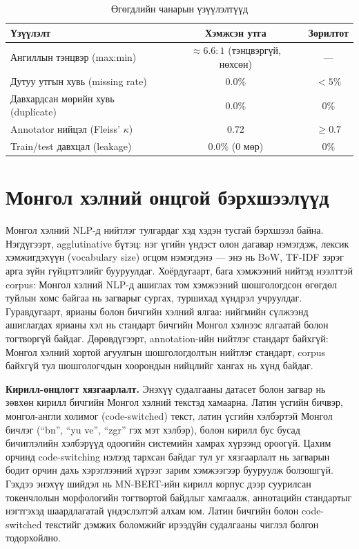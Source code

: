 \begin{table}[H]
\centering
\caption{Өгөгдлийн чанарын үзүүлэлтүүд}
\label{tab:data-quality}
\begin{tabular}{@{}lcc@{}}
\toprule
\textbf{Үзүүлэлт} & \textbf{Хэмжсэн утга} & \textbf{Зорилтот} \\
\midrule
Ангиллын тэнцвэр (max:min)        & $\approx 6.6{:}1$ (тэнцвэргүй, нөхсөн) & --- \\
Дутуу утгын хувь (missing rate)   & $0.0\%$ & $<5\%$ \\
Давхардсан мөрийн хувь (duplicate)& $0.0\%$ & $0\%$ \\
Annotator нийцэл (Fleiss' $\kappa$)& $0.72$ & $\geq 0.7$ \\
Train/test давхцал (leakage)      & $0.0\%$ ($0$ мөр) & $0\%$ \\
\bottomrule
\end{tabular}
\end{table}

\section{Монгол хэлний онцгой бэрхшээлүүд}

Монгол хэлний NLP-д нийтлэг тулгардаг хэд хэдэн тусгай бэрхшээл байна.
Нэгдүгээрт, agglutinative бүтэц: нэг үгийн үндэст олон дагавар нэмэгдэж, лексик
хэмжигдэхүүн (vocabulary size) огцом нэмэгдэнэ --- энэ нь BoW, TF-IDF зэрэг
арга зүйн гүйцэтгэлийг бууруулдаг. Хоёрдугаарт, бага хэмжээний нийтэд нээлттэй
corpus: Монгол хэлний NLP-д ашиглах том хэмжээний шошгологдсон өгөгдөл туйлын
хомс байгаа нь загварыг сургах, туршихад хүндрэл учруулдаг. Гуравдугаарт,
ярианы болон бичгийн хэлний ялгаа: нийгмийн сүлжээнд ашиглагдах ярианы хэл нь
стандарт бичгийн Монгол хэлнээс ялгаатай болон тогтворгүй байдаг. Дөрөвдүгээрт,
annotation-ийн нийтлэг стандарт байхгүй: Монгол хэлний хортой агуулгын
шошгологдолтын нийтлэг стандарт, corpus байхгүй тул шошгологчдын хоорондын
нийцлийг хангах нь хүнд байдаг.

\textbf{Кирилл-онцлогт хязгаарлалт.} Энэхүү судалгааны датасет болон загвар нь
зөвхөн кирилл бичгийн Монгол хэлний текстэд хамаарна. Латин үсгийн бичвэр,
монгол-англи холимог (code-switched) текст, латин үсгийн хэлбэртэй Монгол бичлэг (``bn'',
``yu ve'', ``zgr'' гэх мэт хэлбэр), болон кирилл бус бусад бичиглэлийн хэлбэрүүд
одоогийн системийн хамрах хүрээнд ороогүй. Цахим орчинд code-switching нэлээд
тархсан байдаг тул уг хязгаарлалт нь загварын бодит орчин дахь хэрэглээний
хүрээг зарим хэмжээгээр бууруулж болзошгүй. Гэхдээ энэхүү шийдэл нь MN-BERT-ийн
кирилл корпус дээр суурилсан токенчлолын морфологийн тогтвортой байдлыг
хамгаалж, аннотацийн стандартыг нэгтгэхэд шаардлагатай үндэслэлтэй алхам юм.
Латин бичгийн болон code-switched текстийг дэмжих боломжийг ирээдүйн судалгааны
чиглэл болгон тодорхойлно.

